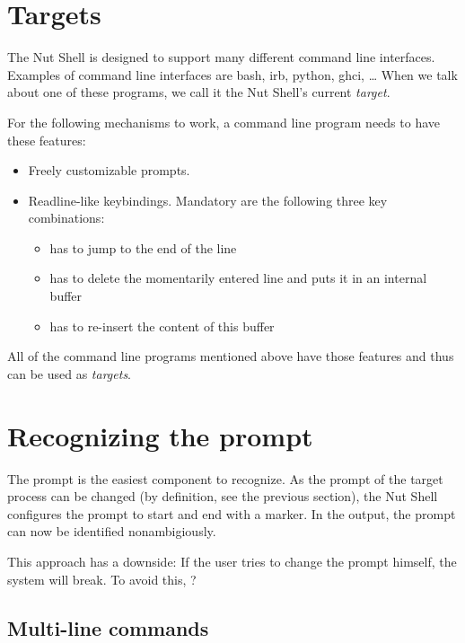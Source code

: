 \documentclass[paper=a4,twoside,abstract=on,cleardoublepage=empty,numbers=noenddot,toc=bib,12pt,appendixprefix=true]{scrreprt}
\begin{document}
\section{Targets}
\label{sec:targets}

The Nut Shell is designed to support many different command line interfaces. Examples of command line interfaces are bash, irb, python, ghci, … When we talk about one of these programs, we call it the Nut Shell's current \emph{target}.

For the following mechanisms to work, a command line program needs to have these features:

\begin{itemize}
    \item Freely customizable prompts.
    \item Readline-like keybindings. Mandatory are the following three key combinations:
        \begin{itemize}
            \item {} has to jump to the end of the line

            \item {} has to delete the momentarily entered line and puts it in an internal buffer
            
            \item {} has to re-insert the content of this buffer
        \end{itemize}
\end{itemize}

All of the command line programs mentioned above have those features and thus can be used as \emph{targets}.

\section{Recognizing the prompt}

The prompt is the easiest component to recognize. As the prompt of the target process can be changed (by definition, see the previous section), the Nut Shell configures the prompt to start and end with a marker. In the output, the prompt can now be identified nonambigiously.

This approach has a downside: If the user tries to change the prompt himself, the system will break. To avoid this, ?

\subsection*{Multi-line commands}
\end{document}
